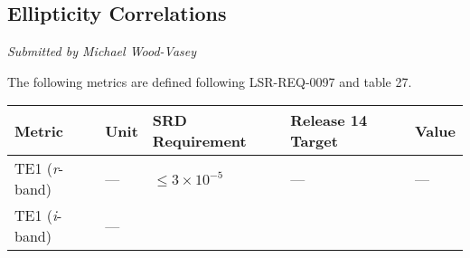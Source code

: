 \documentclass[DM,toc]{lsstdoc}
\begin{document}
\subsection{Ellipticity Correlations}\label{ellipticity-correlations}

\emph{Submitted by Michael Wood-Vasey}

The following metrics are defined following LSR-REQ-0097
 and  table 27.

\begin{longtable}[]{@{}lllll@{}}
\toprule
\begin{minipage}[b]{0.13\columnwidth}\raggedright\strut
Metric\strut
\end{minipage} & \begin{minipage}[b]{0.05\columnwidth}\raggedright\strut
Unit\strut
\end{minipage} & \begin{minipage}[b]{0.24\columnwidth}\raggedright\strut
SRD Requirement\strut
\end{minipage} & \begin{minipage}[b]{0.21\columnwidth}\raggedright\strut
Release 14 Target\strut
\end{minipage} & \begin{minipage}[b]{0.22\columnwidth}\raggedright\strut
Value\strut
\end{minipage}\tabularnewline
\midrule
\endhead
\begin{minipage}[t]{0.13\columnwidth}\raggedright\strut
TE1 (\emph{r}-band)\strut
\end{minipage} & \begin{minipage}[t]{0.05\columnwidth}\raggedright\strut
---\strut
\end{minipage} & \begin{minipage}[t]{0.24\columnwidth}\raggedright\strut
\(\leq 3\times 10^{-5}\)\strut
\end{minipage} & \begin{minipage}[t]{0.21\columnwidth}\raggedright\strut
---\strut
\end{minipage} & \begin{minipage}[t]{0.22\columnwidth}\raggedright\strut
---\strut
\end{minipage}\tabularnewline
\begin{minipage}[t]{0.13\columnwidth}\raggedright\strut
TE1 (\emph{i}-band)\strut
\end{minipage} & \begin{minipage}[t]{0.05\columnwidth}\raggedright\strut
---\strut

\end{minipage}
\end{longtable}
\end{document}
